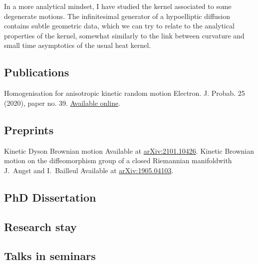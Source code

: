 \documentclass[11pt,classic]{moderncv}
\begin{document}
\smallskip

In a more analytical mindset, I have studied the kernel associated to some degenerate motions. The infinitesimal generator of a hypoelliptic diffusion contains subtle geometric data, which we can try to relate to the analytical properties of the kernel, somewhat similarly to the link between curvature and small time asymptotics of the usual heat kernel.

\subsection{Publications}
   {Homogenisation for anisotropic kinetic random motion}{}{}{}
   {Electron. J. Probab. 25 (2020), paper no. 39. \href{https://projecteuclid.org/euclid.ejp/1585620094}{Available online}.}
\subsection{Preprints}
   {Kinetic Dyson Brownian motion}{}{}{}
   {Available at \href{https://arxiv.org/abs/2101.10426}{arXiv:2101.10426}.}
   {Kinetic Brownian motion on the diffeomorphism group of a closed Riemannian manifold}{with J.~Angst and I.~Bailleul}{}{}
   {Available at \href{https://arxiv.org/abs/1905.04103}{arXiv:1905.04103}.}
\subsection{PhD Dissertation}

\subsection{Research stay}


\subsection{Talks in seminars}
\end{document}
